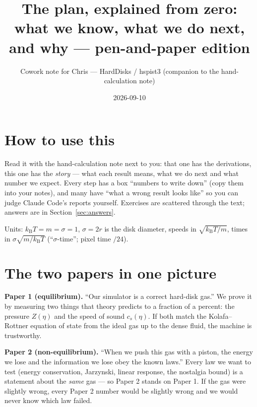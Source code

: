 \documentclass[11pt,a4paper]{article}
\title{The plan, explained from zero:\\ what we know, what we do next, and why --- pen-and-paper edition}
\author{Cowork note for Chris --- HardDisks / hspist3 (companion to the hand-calculation note)}
\date{2026-09-10}
\newcommand{\kT}{k_{\mathrm B}T}
\begin{document}
\maketitle

\section*{How to use this}
Read it with the hand-calculation note next to you: that one has the derivations, this one has the \emph{story} --- what each result means, what we do next and what number we expect. Every step has a box ``numbers to write down'' (copy them into your notes), and many have ``what a wrong result looks like'' so you can judge Claude Code's reports yourself. Exercises are scattered through the text; answers are in Section~\ref{sec:answers}.

Units: $\kT = m = \sigma = 1$, $\sigma = 2r$ is the disk diameter, speeds in $\sqrt{\kT/m}$, times in $\sigma\sqrt{m/\kT}$ (``$\sigma$-time''; pixel time $/24$).

\tableofcontents

\section{The two papers in one picture}

\begin{eli}
\textbf{Paper 1 (equilibrium).} ``Our simulator is a correct hard-disk gas.'' We prove it by measuring two things that theory predicts to a fraction of a percent: the pressure $Z(\eta)$ and the speed of sound $c_s(\eta)$. If both match the Kolafa--Rottner equation of state from the ideal gas up to the dense fluid, the machine is trustworthy.

\textbf{Paper 2 (non-equilibrium).} ``When we push this gas with a piston, the energy we lose and the information we lose obey the known laws.'' Every law we want to test (energy conservation, Jarzynski, linear response, the nostalgia bound) is a statement about the \emph{same} gas --- so Paper 2 stands on Paper 1. If the gas were slightly wrong, every Paper 2 number would be slightly wrong and we would never know which law failed.
\end{eli}
\end{document}
